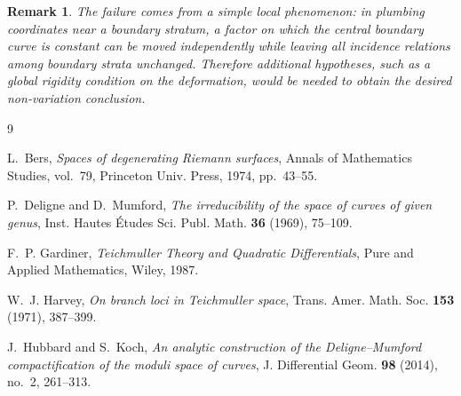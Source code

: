 \documentclass[11pt]{article}
\newtheorem{remark}{Remark}
\begin{document}
\begin{remark}
The failure comes from a simple local phenomenon: in plumbing coordinates
near a boundary stratum, a factor on which the central boundary curve is
constant can be moved independently while leaving all incidence relations
among boundary strata unchanged.  Therefore additional hypotheses, such as
a global rigidity condition on the deformation, would be needed to obtain
the desired non-variation conclusion.
\end{remark}

\begin{thebibliography}{9}

L.~Bers,
\emph{Spaces of degenerating Riemann surfaces},
Annals of Mathematics Studies, vol.~79, Princeton Univ. Press, 1974,
pp.~43--55.

P.~Deligne and D.~Mumford,
\emph{The irreducibility of the space of curves of given genus},
Inst. Hautes \'{E}tudes Sci. Publ. Math. \textbf{36} (1969), 75--109.

F.~P. Gardiner,
\emph{Teichmuller Theory and Quadratic Differentials},
Pure and Applied Mathematics, Wiley, 1987.

W.~J. Harvey,
\emph{On branch loci in Teichmuller space},
Trans. Amer. Math. Soc. \textbf{153} (1971), 387--399.

J.~Hubbard and S.~Koch,
\emph{An analytic construction of the Deligne--Mumford compactification of
the moduli space of curves},
J. Differential Geom. \textbf{98} (2014), no.~2, 261--313.

\end{thebibliography}
\end{document}

